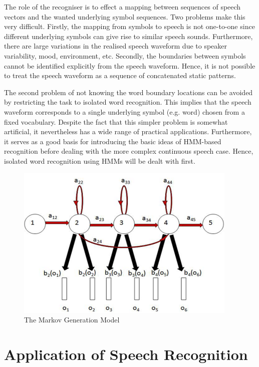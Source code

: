 \documentclass[12pt,a4paper,oneside]{memoir}
\begin{document}
The role of the recogniser is to effect a mapping between sequences of speech vectors and the wanted underlying symbol sequences. Two problems make this very difficult. Firstly, the mapping from symbols to speech is not one-to-one since different underlying symbols can give rise to similar speech sounds. Furthermore, there are large variations in the realised speech waveform due to speaker variability, mood, environment, etc.  Secondly, the boundaries between symbols cannot be identified explicitly from the speech waveform. Hence, it is not possible to treat the speech waveform as a sequence of concatenated static patterns. 

The second problem of not knowing the word boundary locations can be avoided by restricting the task to isolated word recognition. This implies that the speech waveform corresponds to a single underlying symbol (e.g. word) chosen from a fixed vocabulary. Despite the fact that this simpler problem is somewhat artificial, it nevertheless has a wide range of practical applications. Furthermore, it serves as a good basis for introducing the basic ideas of HMM-based recognition before dealing with the more complex continuous speech case. Hence, isolated word recognition using HMMs will be dealt with first.

\begin{figure}[h]
    \centering
    \includegraphics[scale=1.0]{400px-Mfcc_fig5}
    \caption{The Markov Generation Model}
\end{figure}


\section{Application of Speech Recognition}
\end{document}
